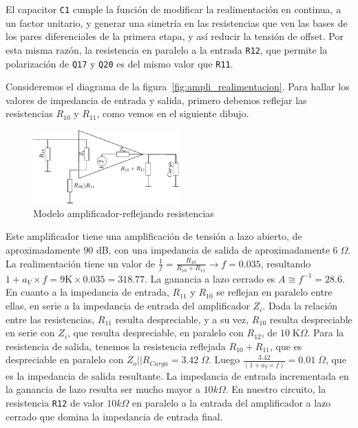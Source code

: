  El capacitor \texttt{C1} cumple la función de modificar la realimentación en continua, a un factor unitario, y generar una simetría en las resistencias que ven las bases de los pares diferenciales de la primera etapa, y así reducir la tensión de offset. Por esta misma razón, la resistencia en paralelo a la entrada \texttt{R12}, que permite la polarización de \texttt{Q17} y \texttt{Q20} es del mismo valor que \texttt{R11}.
 

Consideremos el diagrama de la figura~\ref{fig:ampli_realimentacion}. Para hallar los valores de impedancia de entrada y salida, primero debemos reflejar las resistencias $R_{10}$ y $R_{11}$, como vemos en el siguiente dibujo.

\begin{figure}[H]
	\centering
	\includegraphics[width=0.5\textwidth]{img/reflejo}
	\caption{Modelo amplificador-reflejando resistencias}
	\label{fig:ampli_reflejo}
\end{figure}

Este amplificador tiene una amplificación de tensión a lazo abierto, de aproximadamente $90$ dB, con una impedancia de salida de aproximadamente $6\;\Omega$.
La realimentación tiene un valor de $\frac{1}{f} = \frac{R_{10}}{R_{10} + R_{11}} \rightarrow f = 0.035$, resultando $1+a_V\times f = 9\mathrm{K} \times 0.035 = 318.77$. La ganancia a lazo cerrado es $A\cong f^{-1} =28.6$. En cuanto a la impedancia de entrada, $R_{11}$ y $R_{10}$ se reflejan en paralelo entre ellas, en serie a la impedancia de entrada del amplificador $Z_i$. Dada la relación entre las resistencias, $R_{11}$ resulta despreciable, y a su vez, $R_{10}$ resulta despreciable en serie con $Z_i$, que resulta despreciable, en paralelo con $R_{12}$, de $10\; \mathrm{K}\Omega$. Para la resistencia de salida, tenemos la resistencia reflejada $R_{10} + R_{11}$, que es despreciable en paralelo con $Z_o || R_{Carga} = 3.42\; \Omega$. Luego $\frac{3.42}{(1 + a_V \times f)} = 0.01\; \Omega$, que es la impedancia de salida resultante. La impedancia de entrada incrementada en la ganancia de lazo resulta ser mucho mayor a $10k\Omega$. En nuestro circuito, la resistencia \texttt{R12} de valor $10k\Omega$ en paralelo a la entrada del amplificador a lazo cerrado que domina la impedancia de entrada final.






